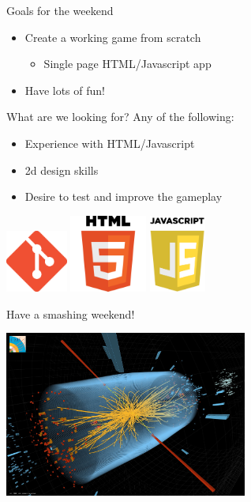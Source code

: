\documentclass[14pt,compress,aspectratio=1610]{beamer}
\begin{document}
\begin{frame}{Goals for the weekend}
  \begin{center}
  \begin{varwidth}{4in}
  \begin{itemize}
    \item Create a working game from scratch
    \begin{itemize}
      \item Single page HTML/Javascript app
    \end{itemize}
    \item Have lots of fun!
  \end{itemize}
  \end{varwidth}
  \end{center}
\end{frame}

\begin{frame}{What are we looking for?}
  Any of the following:

  \begin{center}
  \begin{varwidth}{4in}
  \begin{itemize}
    \item Experience with HTML/Javascript
    \item 2d design skills
    \item Desire to test and improve the gameplay
  \end{itemize}
  \end{varwidth}
  \end{center}

  \centering
  \includegraphics[width=0.8in]{figures/git.png}
  \includegraphics[width=1in]{figures/html5.png}
  \includegraphics[width=0.73in]{figures/js.png}
\end{frame}

\begin{frame}[plain]
  \centering
  \linespread{1}
  \huge
  \vspace{1em}
  Have a smashing weekend!
  \vspace{0.5em}

  \includegraphics[width=0.6\textwidth]{figures/cms.jpg}
\end{frame}
\end{document}
